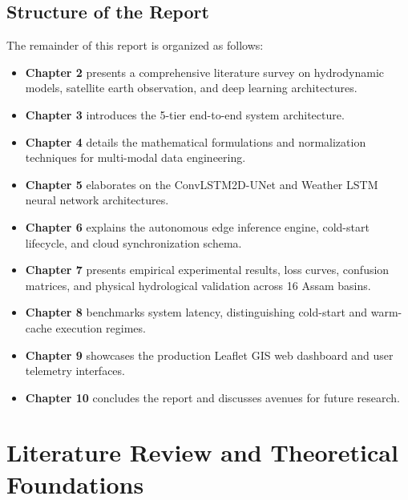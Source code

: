 \documentclass[12pt,a4paper,oneside]{report}
\begin{document}
\section{Structure of the Report}
The remainder of this report is organized as follows:
\begin{itemize}
    \item \textbf{Chapter 2} presents a comprehensive literature survey on hydrodynamic models, satellite earth observation, and deep learning architectures.
    \item \textbf{Chapter 3} introduces the 5-tier end-to-end system architecture.
    \item \textbf{Chapter 4} details the mathematical formulations and normalization techniques for multi-modal data engineering.
    \item \textbf{Chapter 5} elaborates on the ConvLSTM2D-UNet and Weather LSTM neural network architectures.
    \item \textbf{Chapter 6} explains the autonomous edge inference engine, cold-start lifecycle, and cloud synchronization schema.
    \item \textbf{Chapter 7} presents empirical experimental results, loss curves, confusion matrices, and physical hydrological validation across 16 Assam basins.
    \item \textbf{Chapter 8} benchmarks system latency, distinguishing cold-start and warm-cache execution regimes.
    \item \textbf{Chapter 9} showcases the production Leaflet GIS web dashboard and user telemetry interfaces.
    \item \textbf{Chapter 10} concludes the report and discusses avenues for future research.
\end{itemize}

\chapter{Literature Review and Theoretical Foundations}
\label{chap:lit_review}
\end{document}
